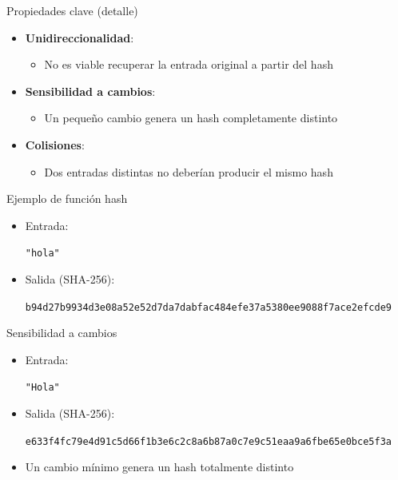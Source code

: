 \documentclass{beamer}
\begin{document}
\begin{frame}{Propiedades clave (detalle)}
\begin{itemize}
  \item \textbf{Unidireccionalidad}:
  \begin{itemize}
    \item No es viable recuperar la entrada original a partir del hash
  \end{itemize}
  \item \textbf{Sensibilidad a cambios}:
  \begin{itemize}
    \item Un pequeño cambio genera un hash completamente distinto
  \end{itemize}
  \item \textbf{Colisiones}:
  \begin{itemize}
    \item Dos entradas distintas no deberían producir el mismo hash
  \end{itemize}
\end{itemize}
\end{frame}

\begin{frame}{Ejemplo de función hash}
\begin{itemize}
  \item Entrada:
  \begin{center}
    \texttt{"hola"}
  \end{center}
  \item Salida (SHA-256):
  \begin{center}
    \tiny
    \texttt{b94d27b9934d3e08a52e52d7da7dabfac484efe37a5380ee9088f7ace2efcde9}
  \end{center}
\end{itemize}
\end{frame}

\begin{frame}{Sensibilidad a cambios}
\begin{itemize}
  \item Entrada:
  \begin{center}
    \texttt{"Hola"}
  \end{center}
  \item Salida (SHA-256):
  \begin{center}
    \tiny
    \texttt{e633f4fc79e4d91c5d66f1b3e6c2c8a6b87a0c7e9c51eaa9a6fbe65e0bce5f3a}
  \end{center}
  \item Un cambio mínimo genera un hash totalmente distinto
\end{itemize}
\end{frame}
\end{document}
